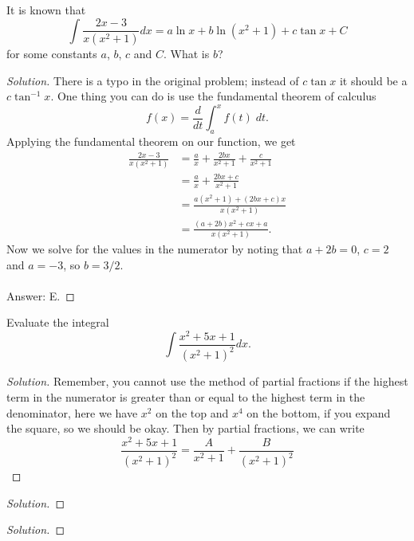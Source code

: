 \begin{problem}
It is known that
\[
\int\frac{2x-3}{x\left(x^2+1\right)}dx=a\ln x+b\ln\left(x^2+1\right)+c\tan x+C
\]
for some constants $a$, $b$, $c$ and $C$. What is $b$?
\end{problem}
\begin{proof}[Solution]
There is a typo in the original problem; instead of $c\tan x$ it should be
a $c\tan^{-1}x$. One thing you can do is use the fundamental theorem of
calculus
\begin{equation}
  \label{eq:fundamental-theorem-of-calculus}
f(x)=\frac{d}{dt}\int_a^x f(t)\;dt.
\end{equation}
Applying the fundamental theorem on our function, we get
\begin{align*}
\frac{2x-3}{x\left(x^2+1\right)}
&=\frac{a}{x}+\frac{2bx}{x^2+1}+\frac{c}{x^2+1}\\
&=\frac{a}{x}+\frac{2bx+c}{x^2+1}\\
&=\frac{a\left(x^2+1\right)+(2bx+c)x}{x\left(x^2+1\right)}\\
&=\frac{(a+2b)x^2+cx+a}{x\left(x^2+1\right)}.
\end{align*}
Now we solve for the values in the numerator by noting that $a+2b=0$, $c=2$
and $a=-3$, so $b=3/2$.
\\\\
Answer: E.
\end{proof}
\begin{problem}
Evaluate the integral
\[
\int\frac{x^2+5x+1}{\left(x^2+1\right)^2}dx.
\]
\end{problem}
\begin{proof}[Solution]
Remember, you cannot use the method of partial fractions if the highest
term in the numerator is greater than or equal to the highest term in the
denominator, here we have $x^2$ on the top and $x^4$ on the bottom, if you
expand the square, so we should be okay. Then by partial fractions, we can
write
\[
\frac{x^2+5x+1}{\left(x^2+1\right)^2}=\frac{A}{x^2+1}+\frac{B}{\left(x^2+1\right)^2}
\]
\end{proof}
\begin{problem}
\end{problem}
\begin{proof}[Solution]
\end{proof}
\begin{problem}
\end{problem}
\begin{proof}[Solution]
\end{proof}
\begin{problem}
\end{problem}

